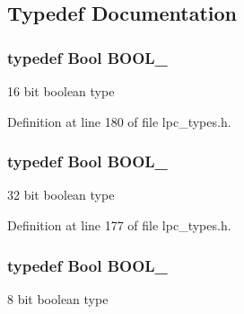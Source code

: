 \subsection{\-Typedef \-Documentation}
\hypertarget{group___l_p_c___types___public___types_gaa14120a3f1d4674cce6060fe093abde0}{
\subsubsection[{\-B\-O\-O\-L\-\_\-16}]{\setlength{\rightskip}{0pt plus 5cm}typedef {\bf \-Bool} {\bf \-B\-O\-O\-L\-\_}}}\label{group___l_p_c___types___public___types_gaa14120a3f1d4674cce6060fe093abde0}
16 bit boolean type 

\-Definition at line 180 of file lpc\-\_\-types.\-h.

\hypertarget{group___l_p_c___types___public___types_gae82ce7bbea976c0646ed6458705df2ae}{
\subsubsection[{\-B\-O\-O\-L\-\_\-32}]{\setlength{\rightskip}{0pt plus 5cm}typedef {\bf \-Bool} {\bf \-B\-O\-O\-L\-\_}}}\label{group___l_p_c___types___public___types_gae82ce7bbea976c0646ed6458705df2ae}
32 bit boolean type 

\-Definition at line 177 of file lpc\-\_\-types.\-h.

\hypertarget{group___l_p_c___types___public___types_gaefbcf737e3e031d1b6522b4cd079a292}{
\subsubsection[{\-B\-O\-O\-L\-\_\-8}]{\setlength{\rightskip}{0pt plus 5cm}typedef {\bf \-Bool} {\bf \-B\-O\-O\-L\-\_}}}\label{group___l_p_c___types___public___types_gaefbcf737e3e031d1b6522b4cd079a292}
8 bit boolean type 

